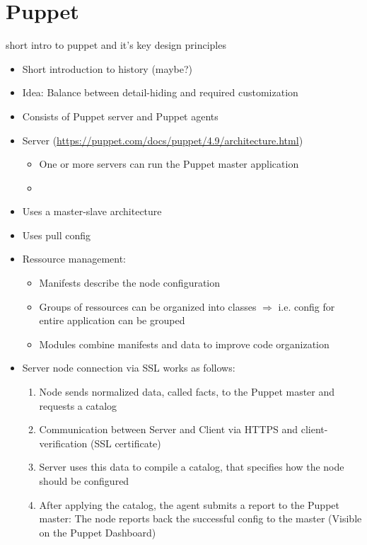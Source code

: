 \section{Puppet}
short intro to puppet and it's key design principles 

	\begin{itemize}
		\item Short introduction to history (maybe?)
		\item Idea: Balance between detail-hiding and required customization
	\end{itemize}

	\begin{itemize}
		\item Consists of Puppet server and Puppet agents
		\item Server (\url{https://puppet.com/docs/puppet/4.9/architecture.html})
		\begin{itemize}
			\item One or more servers can run the Puppet master application
			\item 
		\end{itemize}
		\item Uses a master-slave architecture
		\item Uses pull config
		\item Ressource management:
		\begin{itemize}
			\item Manifests describe the node configuration
			\item Groups of ressources can be organized into classes $\Rightarrow$ i.e. config for entire application can be grouped
			\item Modules combine manifests and data to improve code organization
		\end{itemize}
		\item Server node connection via SSL works as follows:
		\begin{enumerate}
			\item Node sends normalized data, called facts, to the Puppet master and requests a catalog
			\item Communication between Server and Client via HTTPS and client-verification (SSL certificate)
			\item Server uses this data to compile a catalog, that specifies how the node should be configured
			\item After applying the catalog, the agent submits a report to the Puppet master: The node reports back the successful config to the master (Visible on the Puppet Dashboard)

\end{enumerate}
\end{itemize}
